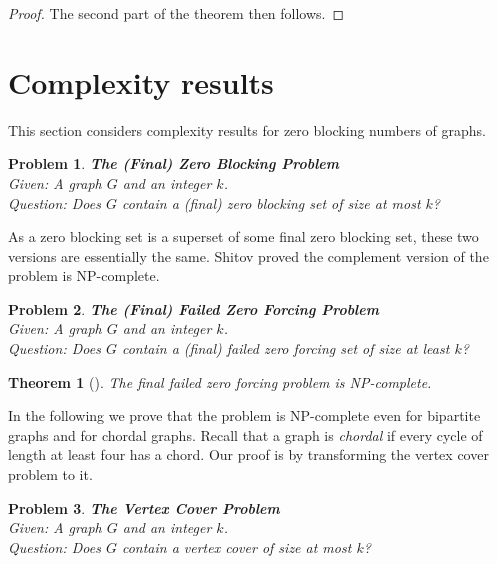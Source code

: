 \documentclass[preprint,12pt]{elsarticle}
\newtheorem{theorem}{Theorem}
\newtheorem{problem}{Problem}
\begin{document}
{\begin{proof}
The second part of the theorem then follows.
\end{proof}


\section{Complexity results} \label{sec-tree}
 
This section considers complexity results for zero blocking numbers of graphs.

 
\begin{problem}
{\bf The (Final) Zero Blocking Problem}\\
{\rm Given:} A graph $G$ and an integer $k$.\\
{\rm Question:} Does $G$ contain a (final) zero blocking set of size at most $k$?
\end{problem}

As a zero blocking set is a superset of some final zero blocking set,
these two versions are essentially the same.
Shitov \cite{2017s} proved the complement version of the problem is NP-complete.

\begin{problem}
{\bf The (Final) Failed Zero Forcing Problem}\\
{\rm Given:} A graph $G$ and an integer $k$.\\
{\rm Question:} Does $G$ contain a (final) failed zero forcing set of size at least $k$?
\end{problem}

\begin{theorem}[\cite{2017s}]
The {final} failed zero forcing problem is NP-complete.
\end{theorem}

In the following we prove that the problem is NP-complete even for bipartite graphs and for chordal graphs.
Recall that a graph is {\em chordal} if every cycle of length at least four has a chord.
Our proof is by transforming the vertex cover problem to it.


\begin{problem}
{\bf The Vertex Cover Problem}\\
{\rm Given:} A graph $G$ and an integer $k$.\\
{\rm Question:} Does $G$ contain a vertex cover of size at most $k$?
\end{problem}

}
\end{document}
